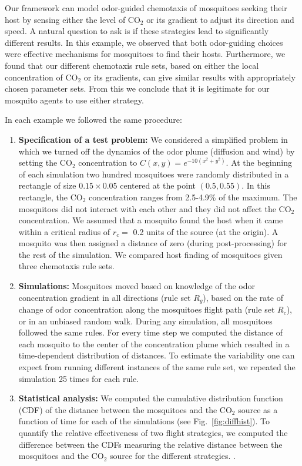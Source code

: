 \documentclass[12pt]{article}
\newif\ifcommentsw
\newcommand{\comment}[1]{\ifcommentsw  $\blacktriangleright$\ \textbf{#1}\ $\blacktriangleleft$ \fi}
\begin{document}
		Our framework can model odor-guided chemotaxis
		of mosquitoes seeking their host by
sensing either the level of CO$_2$ or its gradient to adjust its
direction and speed.  A natural question to ask is if these
strategies lead to significantly different results.  In this example,
we observed that both odor-guiding
choices were effective mechanisms for mosquitoes to find their hosts.
Furthermore, we found that our  different
chemotaxis rule sets, based on either the local concentration
of CO$_2$ or its gradients, can give similar results with appropriately chosen parameter sets. From this we conclude that it is legitimate for our mosquito agents to use either strategy.

	In each example we followed the same procedure:
\begin{enumerate}
	\item
	\textbf{Specification of a test problem:} We considered a
simplified problem in which we turned off the dynamics of the
odor plume (diffusion and wind) by setting the CO$_2$ concentration to $C(x,y) =
e^{-10(x^2+y^2)}$. At the beginning of each simulation two hundred mosquitoes were randomly distributed in a rectangle of size $0.15\times 0.05$ centered at the
point $(0.5,0.55)$. In this rectangle, the CO$_2$
concentration ranges from 2.5-4.9\% of the maximum. The
mosquitoes did not interact with each other and they did not
affect the CO$_2$ concentration. 
We assumed that a mosquito
found the host when it came within a critical radius of
$r_c = $ 0.2 units of
	the source (at the origin). A mosquito was then assigned a distance of zero (during post-processing) for the rest of the
	simulation. We compared host finding of mosquitoes given three chemotaxis rule sets.
\item
\textbf{Simulations:} Mosquitoes moved based on knowledge of the odor concentration gradient in all directions (rule set $R_g$), based on the rate of change of odor concentration along the mosquitoes flight path (rule set $R_c$), or in an unbiased random walk. During any simulation, all mosquitoes followed the same rules. For every time step we computed the
distance of each mosquito to the center of the concentration plume which resulted in a time-dependent
distribution of distances. To estimate the variability one can expect from running different instances of the same rule set, we repeated the simulation 25 times for each rule.

\item \textbf{Statistical analysis:} We computed the 
    cumulative distribution function (CDF) of the distance between the mosquitoes and the CO$_2$ source as a function of time for each of the simulations 
     (see Fig.~\ref{fig:diffhist}).  To quantify the relative effectiveness of two flight strategies, we computed the
    difference between the CDFs measuring the relative distance between the mosquitoes and the CO$_2$ source for the different strategies. 
    \comment{I think this is a little confusing; distance between what? I cannot think of an obvious measure of distance between two CDFs ... IF  I modified the description a bit. This makes sense to me, but I'm not sure this is exactlywhat was one.   I get it right MH}. \comment{No, that isn't quite it. We'll talk about it at the meeting. BC}
    

\end{enumerate}
\end{document}
